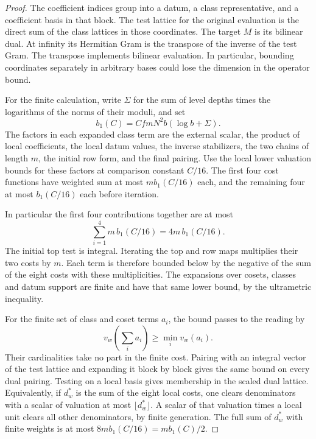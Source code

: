 \begin{proof}
The coefficient indices group into a datum, a class
representative, and a coefficient basis in that block.
The test lattice for the original evaluation is the direct
sum of the class lattices in those coordinates. The target
\(M\) is its bilinear dual. At infinity its Hermitian Gram
is the transpose of the inverse of the test Gram. The
transpose implements bilinear evaluation. In particular,
bounding coordinates separately in arbitrary bases could
lose the dimension in the operator bound.

For the finite calculation, write \(\Sigma\) for the sum of
level depths times the logarithms of the norms of their
moduli, and set
\[
 b_1(C)=CfmN^2b(\log b+\Sigma).
\]
The factors in each expanded class term are the external
scalar, the product of local coefficients, the local datum
values, the inverse stabilizers, the two chains of length
\(m\), the initial row form, and the final pairing.
Use the local lower valuation bounds for these factors at
comparison constant \(C/16\). The first four cost functions
have weighted sum at most \(m b_1(C/16)\) each, and the
remaining four at most \(b_1(C/16)\) each before iteration.

In particular the first four contributions together are at most
\[
  \sum_{i=1}^4 m\,b_1(C/16)=4m\,b_1(C/16).
\]
The initial top test is integral. Iterating the top and row
maps multiplies their two costs by \(m\). Each term is
therefore bounded below by the negative of the sum of the
eight costs with these multiplicities. The expansions over
cosets, classes and datum support are finite and have that
same lower bound, by the ultrametric inequality.

For the finite set of class and coset terms \(a_i\), the bound passes to the reading by
\[
  v_w\left(\sum_i a_i\right)\ge\min_i v_w(a_i).
\]
 Their
cardinalities take no part in the finite cost. Pairing with
an integral vector of the test lattice and expanding it
block by block gives the same bound on every dual pairing.
Testing on a local basis gives membership in the scaled
dual lattice. Equivalently, if \(d_w^*\) is the sum of the
eight local costs, one clears denominators with a scalar
of valuation at most \(\lfloor d_w^*\rfloor\). A scalar of
that valuation times a local unit clears all other
denominators, by finite generation. The full sum of
\(d_w^*\) with finite weights is at most
\(8m b_1(C/16)=m b_1(C)/2\).


\end{proof}
